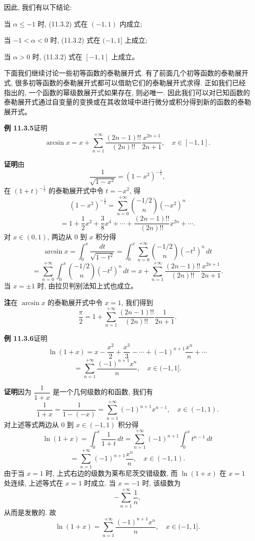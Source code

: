 \documentclass[UTF8, 12pt, fontset=fandol, oneside]{ctexart}
\begin{document}
因此, 我们有以下结论:

当 $\alpha\leqslant-1$ 时, (11.3.2) 式在 $(-1,1)$ 内成立;

当 $-1<\alpha<0$ 时, (11.3.2) 式在 $(-1,1]$ 上成立;

当 $\alpha>0$ 时, (11.3.2) 式在 $[-1,1]$ 上成立。

下面我们继续讨论一些初等函数的泰勒展开式. 有了前面几个初等函数的泰勒展开式, 很多初等函数的泰勒展开式都可以借助它们的泰勒展开式求得. 正如我们已经指出的, 一个函数的幂级数展开式如果存在, 则必唯一. 因此我们可以对已知函数的泰勒展开式通过自变量的变换或在其收敛域中进行微分或积分得到新的函数的泰勒展开式。

\noindent\textbf{例 11.3.5}\quad 证明
\[
  \arcsin x
  =
  x+\sum_{n=1}^{+\infty}
  \frac{(2n-1)!!}{(2n)!!}\frac{x^{2n+1}}{2n+1},
  \quad x\in[-1,1].
\]

\noindent\textbf{证明}\quad 由
\[
  \frac1{\sqrt{1-x^2}}=(1-x^2)^{-\frac12},
\]
在 $(1+t)^{-\frac12}$ 的泰勒展开式中令 $t=-x^2$, 得
\[
  (1-x^2)^{-\frac12}
  =
  \sum_{n=0}^{+\infty}\binom{-1/2}{n}(-x^2)^n
\]
\[
  =
  1+\frac12x^2+\frac38x^4+\cdots
  +\frac{(2n-1)!!}{(2n)!!}x^{2n}+\cdots .
\]
对 $x\in(0,1)$, 两边从 $0$ 到 $x$ 积分得
\[
  \arcsin x
  =
  \int_0^x\frac{dt}{\sqrt{1-t^2}}
  =
  \int_0^x
  \sum_{n=0}^{+\infty}\binom{-1/2}{n}(-t^2)^n\,dt
\]
\[
  =
  \sum_{n=0}^{+\infty}
  \int_0^x\binom{-1/2}{n}(-t^2)^n\,dt
  =
  x+\sum_{n=1}^{+\infty}
  \frac{(2n-1)!!}{(2n)!!}\frac{x^{2n+1}}{2n+1}.
\]
当 $x=\pm1$ 时, 由拉贝判别法知上式也成立。

\noindent\textbf{注}\quad 在 $\arcsin x$ 的泰勒展开式中令 $x=1$, 我们得到
\[
  \frac{\pi}{2}
  =
  1+\sum_{n=1}^{+\infty}
  \frac{(2n-1)!!}{(2n)!!}\frac1{2n+1}.
\]

\noindent\textbf{例 11.3.6}\quad 证明
\[
  \ln(1+x)
  =
  x-\frac{x^2}{2}+\frac{x^3}{3}-\cdots
  +(-1)^{n+1}\frac{x^n}{n}+\cdots
\]
\[
  =
  \sum_{n=1}^{+\infty}\frac{(-1)^{n+1}x^n}{n},
  \quad x\in(-1,1].
\]

\noindent\textbf{证明}\quad 因为 $\dfrac1{1+x}$ 是一个几何级数的和函数, 我们有
\[
  \frac1{1+x}
  =
  \frac1{1-(-x)}
  =
  \sum_{n=1}^{+\infty}(-1)^{n+1}x^{n-1},
  \quad x\in(-1,1).
\]
对上述等式两边从 $0$ 到 $x\in(-1,1)$ 积分得
\[
  \ln(1+x)
  =
  \int_0^x\frac1{1+t}\,dt
  =
  \sum_{n=1}^{+\infty}(-1)^{n+1}\int_0^x t^{n-1}\,dt
\]
\[
  =
  \sum_{n=1}^{+\infty}(-1)^{n+1}\frac{x^n}{n},
  \quad x\in(-1,1).
\]
由于当 $x=1$ 时, 上式右边的级数为莱布尼茨交错级数, 而 $\ln(1+x)$ 在 $x=1$ 处连续, 上述等式在 $x=1$ 时成立. 当 $x=-1$ 时, 该级数为
\[
  -\sum_{n=1}^{+\infty}\frac1n,
\]
从而是发散的. 故
\[
  \ln(1+x)
  =
  \sum_{n=1}^{+\infty}\frac{(-1)^{n+1}x^n}{n},
  \quad x\in(-1,1].
\]
\end{document}
